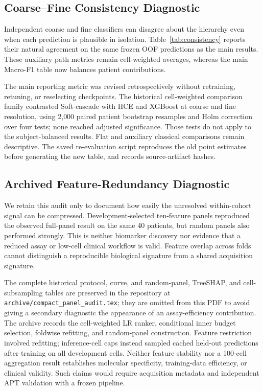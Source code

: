 \documentclass{article} %
\begin{document}
\subsection{Coarse--Fine Consistency Diagnostic}
\label{sec:appendix:consistency}

Independent coarse and fine classifiers can disagree about the hierarchy even
when each prediction is plausible in isolation. Table~\ref{tab:consistency}
reports their natural agreement on the same frozen OOF predictions as the
main results. These auxiliary path metrics remain cell-weighted averages,
whereas the main Macro-F1 table now balances patient contributions.




The main reporting metric was revised retrospectively without retraining,
retuning, or reselecting checkpoints. The historical cell-weighted comparison
family contrasted Soft-cascade with HCE and XGBoost at coarse and fine
resolution, using 2{,}000 paired patient bootstrap resamples and Holm correction
over four tests; none reached adjusted significance. Those tests do not apply
to the subject-balanced results. Flat and auxiliary classical comparisons
remain descriptive. The saved re-evaluation script reproduces the old point
estimates before generating the new table, and records source-artifact hashes.



\subsection{Archived Feature-Redundancy Diagnostic}
\label{sec:appendix:minimal_panel}

We retain this audit only to document how easily the unresolved within-cohort
signal can be compressed. Development-selected ten-feature panels reproduced
the observed full-panel result on the same 40 patients, but random panels also
performed strongly. This is neither biomarker discovery nor evidence that a
reduced assay or low-cell clinical workflow is valid. Feature overlap across
folds cannot distinguish a reproducible biological signature from a shared
acquisition signature.

The complete historical protocol, curve, and random-panel, TreeSHAP, and
cell-subsampling tables are preserved in the repository at
\texttt{archive/compact\_panel\_audit.tex}; they are omitted from this PDF to
avoid giving a secondary diagnostic the appearance of an assay-efficiency
contribution. The archive records the cell-weighted LR ranker, conditional
inner budget selection, foldwise refitting, and random-panel construction.
Feature restriction involved refitting; inference-cell caps instead sampled
cached held-out predictions after training on all development cells. Neither
feature stability nor a 100-cell aggregation result establishes molecular
specificity, training-data efficiency, or clinical validity. Such claims would
require acquisition metadata and independent APT validation with a frozen
pipeline.
\end{document}

